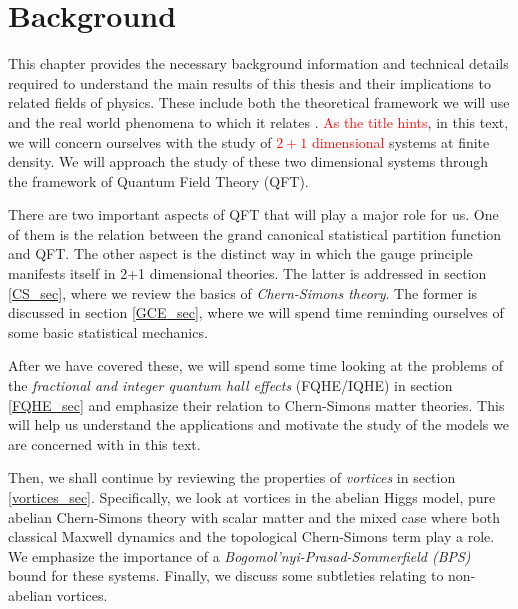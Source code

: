 
    \graphicspath{{Background_Folder/figures/PNG/}{Background_Folder/figures/PDF/}{Background_Folder/figures/}}

\chapter{Background}
This chapter provides the necessary background information and technical details required to understand the main results of this thesis and their implications to related fields of physics. These include both the theoretical framework we will use and the real world phenomena to which it relates \colorbox{red}{ }. \textcolor{red}{As the title hints}, in this text, we will concern ourselves with the study of \textcolor{red}{$2+1$ dimensional} systems at finite density. We will approach the study of these two dimensional systems through the framework of Quantum Field Theory (QFT). 

    There are two important aspects of QFT that will play a major role for us. One of them is the relation between the grand canonical statistical partition function and QFT. The other aspect is the distinct way in which the gauge principle manifests itself in 2+1 dimensional theories. The latter is addressed in section \ref{CS_sec}, where we review the basics of \textit{Chern-Simons theory}. The former is discussed in section \ref{GCE_sec}, where we will spend time reminding ourselves of some basic statistical mechanics. 


    After we have covered these, we will spend some time looking at the problems of the \textit{fractional and integer quantum hall effects} (FQHE/IQHE) in section \ref{FQHE_sec} and emphasize their relation to Chern-Simons matter theories. This will help us understand the applications and motivate the study of the models we are concerned with in this text.

    Then, we shall continue by reviewing the properties of \textit{vortices} in section \ref{vortices_sec}. Specifically, we look at vortices in the abelian Higgs model, pure abelian Chern-Simons theory with scalar matter and the mixed case where both classical Maxwell dynamics and the topological Chern-Simons term play a role. We emphasize the importance of a \textit{Bogomol'nyi-Prasad-Sommerfield (BPS)} \cite{Bogomolny:1975de, Prasad:1975kr} bound for these systems. Finally, we discuss some subtleties relating to non-abelian vortices.

